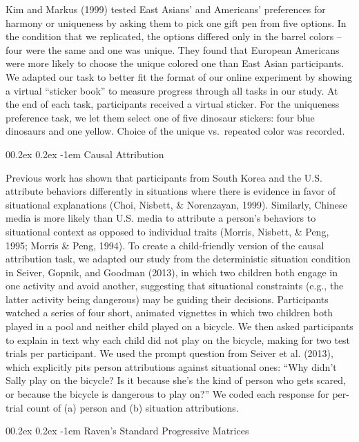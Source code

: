 \documentclass[
  man]{apa6}
\makeatletter
\let\oldparagraph\paragraph
\renewcommand{\paragraph}[1]{\oldparagraph{#1}\mbox{}}
\renewcommand{\paragraph}{\@startsection{paragraph}{4}{\parindent}%
  {0\baselineskip \@plus 0.2ex \@minus 0.2ex}%
  {-1em}%
  {\normalfont\normalsize\bfseries\itshape\typesectitle}}
\makeatother
\begin{document}
Kim and Markus (1999) tested East Asians' and Americans' preferences for harmony or uniqueness by asking them to pick one gift pen from five options. In the condition that we replicated, the options differed only in the barrel colors -- four were the same and one was unique. They found that European Americans were more likely to choose the unique colored one than East Asian participants. We adapted our task to better fit the format of our online experiment by showing a virtual ``sticker book'' to measure progress through all tasks in our study. At the end of each task, participants received a virtual sticker. For the uniqueness preference task, we let them select one of five dinosaur stickers: four blue dinosaurs and one yellow. Choice of the unique vs.~repeated color was recorded.

\hypertarget{causal-attribution}{%
\paragraph{Causal Attribution}\label{causal-attribution}}

Previous work has shown that participants from South Korea and the U.S. attribute behaviors differently in situations where there is evidence in favor of situational explanations (Choi, Nisbett, \& Norenzayan, 1999). Similarly, Chinese media is more likely than U.S. media to attribute a person's behaviors to situational context as opposed to individual traits (Morris, Nisbett, \& Peng, 1995; Morris \& Peng, 1994). To create a child-friendly version of the causal attribution task, we adapted our study from the deterministic situation condition in Seiver, Gopnik, and Goodman (2013), in which two children both engage in one activity and avoid another, suggesting that situational constraints (e.g., the latter activity being dangerous) may be guiding their decisions. Participants watched a series of four short, animated vignettes in which two children both played in a pool and neither child played on a bicycle. We then asked participants to explain in text why each child did not play on the bicycle, making for two test trials per participant. We used the prompt question from Seiver et al. (2013), which explicitly pits person attributions against situational ones: ``Why didn't Sally play on the bicycle? Is it because she's the kind of person who gets scared, or because the bicycle is dangerous to play on?'' We coded each response for per-trial count of (a) person and (b) situation attributions.

\hypertarget{ravens-standard-progressive-matrices}{%
\paragraph{Raven's Standard Progressive Matrices}\label{ravens-standard-progressive-matrices}}
\end{document}

